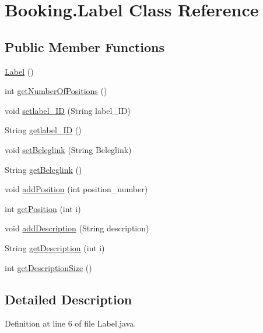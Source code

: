\hypertarget{class_booking_1_1_label}{}\section{Booking.\+Label Class Reference}
\label{class_booking_1_1_label}
\subsection*{Public Member Functions}
\begin{DoxyCompactItemize}
\item 
\hyperlink{class_booking_1_1_label_aa37e4a1b487852af0cb450d7a578c2d9}{Label} ()
\item 
int \hyperlink{class_booking_1_1_label_a229dcc8da3134cae1526c9ae3ffaa048}{get\+Number\+Of\+Positions} ()
\item 
void \hyperlink{class_booking_1_1_label_a714cff6c53d7ede37910689f94498f70}{setlabel\+\_\+\+ID} (String label\+\_\+\+ID)
\item 
String \hyperlink{class_booking_1_1_label_a46dcc1ddc8ffc895f6f49b3fbc7bff9a}{getlabel\+\_\+\+ID} ()
\item 
void \hyperlink{class_booking_1_1_label_a2bab5fca7c127202fc64417b9cc3a2d1}{set\+Beleglink} (String Beleglink)
\item 
String \hyperlink{class_booking_1_1_label_a05f8d607c2d99cb430d7043525536671}{get\+Beleglink} ()
\item 
void \hyperlink{class_booking_1_1_label_ac49e674df6f0d4567379d6b55bd4b149}{add\+Position} (int position\+\_\+number)
\item 
int \hyperlink{class_booking_1_1_label_a93c786152ce21835d719a6360e2a549a}{get\+Position} (int i)
\item 
void \hyperlink{class_booking_1_1_label_aceebf469651c6e8f2a76e8972b3cb088}{add\+Description} (String description)
\item 
String \hyperlink{class_booking_1_1_label_a3223f20d68a3ac41afa92c39a9bf652a}{get\+Description} (int i)
\item 
int \hyperlink{class_booking_1_1_label_a3462c235882d7fcbf385aa65055f3716}{get\+Description\+Size} ()
\end{DoxyCompactItemize}


\subsection{Detailed Description}


Definition at line 6 of file Label.\+java.



